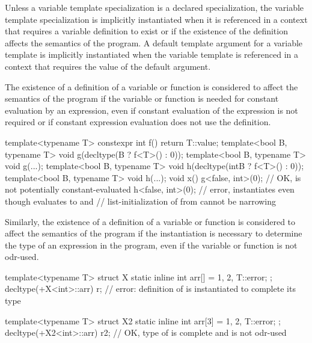 \pnum
Unless a variable template specialization is a declared specialization,
the variable template specialization is implicitly instantiated
when it is referenced in a context
that requires a variable definition to exist or
if the existence of the definition affects the semantics of the program.
A default template argument for a variable template is implicitly instantiated
when the variable template is referenced in a context
that requires the value of the default argument.

\pnum
{}%
%
%
%
The existence of a definition of a variable or function
is considered to affect the semantics of the program
if the variable or function
is needed for constant evaluation by an expression,
even if constant evaluation of the expression is not required or
if constant expression evaluation does not use the definition.

\begin{example}
\begin{codeblock}
template<typename T> constexpr int f() { return T::value; }
template<bool B, typename T> void g(decltype(B ? f<T>() : 0));
template<bool B, typename T> void g(...);
template<bool B, typename T> void h(decltype(int{B ? f<T>() : 0}));
template<bool B, typename T> void h(...);
void x() {
  g<false, int>(0); // OK,  is not potentially constant-evaluated
  h<false, int>(0); // error, instantiates  even though  evaluates to  and
                    // list-initialization of  from  cannot be narrowing
}
\end{codeblock}
\end{example}

\pnum
Similarly,
the existence of a definition of a variable or function
is considered to affect the semantics of the program
if the instantiation is necessary to
determine the type of an expression in the program,
even if the variable or function is not odr-used.
\begin{example}
\begin{codeblock}
template<typename T> struct X {
  static inline int arr[] = {1, 2, T::error};
};
decltype(+X<int>::arr) r;   // error: definition of  is instantiated to complete its type

template<typename T> struct X2 {
  static inline int arr[3] = {1, 2, T::error};
};
decltype(+X2<int>::arr) r2; // OK, type of  is complete and  is not odr-used
\end{codeblock}
\end{example}

